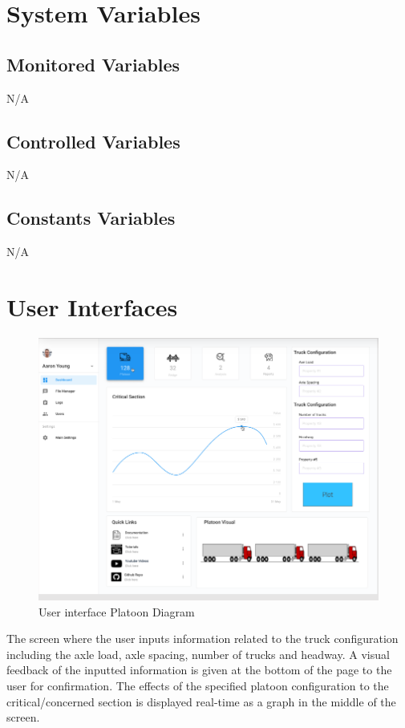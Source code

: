 \documentclass[12pt, titlepage]{article}
\begin{document}
\section{System Variables}

\subsection{Monitored Variables}
N/A
\subsection{Controlled Variables}
N/A
\subsection{Constants Variables}
N/A
\section{User Interfaces}
\begin{figure}[H]
  \centering
  \includegraphics[]{../images/Userinterface-Platoon.PNG}
  \caption{User interface Platoon Diagram}
  \label{fig:userinterface-platoon-diagram}
\end{figure}
The screen where the user inputs information related to the truck configuration including the axle load, axle spacing, number of trucks and headway. A visual feedback of the inputted information is given at the bottom of the page to the user for confirmation. The effects of the specified platoon configuration to the critical/concerned section is displayed real-time as a graph in the middle of the screen. \\\\
\end{document}
